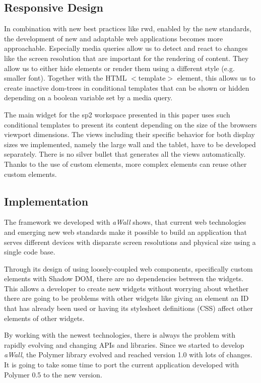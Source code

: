 \documentclass{sigchi}
\begin{document}
\subsection{Responsive Design}
In combination with new best practices like \gls{rwd}, enabled by the new standards, the development of new and adaptable web applications becomes more approachable.
Especially media queries allow us to detect and react to changes like the screen resolution that are important for the rendering of content.
They allow us to either hide elements or render them using a different style (e.g. smaller font).
Together with the HTML $<$template$>$ element, this allows us to create inactive \gls{dom}-trees in conditional templates that can be shown or hidden depending on a boolean variable set by a media query.

The main widget for the \gls{sp2} workspace presented in this paper uses such conditional templates to present its content depending on the size of the browsers viewport dimensions.
The views including their specific behavior for both display sizes we implemented, namely the large wall and the tablet, have to be developed separately.
There is no silver bullet that generates all the views automatically.
Thanks to the use of custom elements, more complex elements can reuse other custom elements.


\subsection{Implementation}
The framework we developed with \textit{aWall} shows, that current web technologies and emerging new web standards make it possible to build an application that serves different devices with disparate screen resolutions and physical size using a single code base. 

Through its design of using loosely-coupled web components, specifically custom elements with Shadow DOM, there are no dependencies between the widgets.
This allows a developer to create new widgets without worrying about whether there are going to be problems with other widgets like  giving an element an ID that has already been used or having its stylesheet definitions (CSS) affect other elements of other widgets.

By working with the newest technologies, there is always the problem with rapidly evolving and changing APIs and libraries.
Since we started to develop \textit{aWall}, the Polymer library evolved and reached version 1.0 with lots of changes.
It is going to take some time to port the current application developed with Polymer 0.5 to the new version. 
\end{document}
